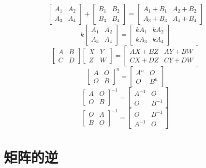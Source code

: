\[
\begin{bmatrix}
A_1 & A_2 \\ 
A_3 & A_4
\end{bmatrix} + 
\begin{bmatrix}
B_1 & B_2 \\ 
B_3 & B_4
\end{bmatrix} = 
\begin{bmatrix}
A_1 + B_1 & A_2 + B_2 \\ 
A_3 + B_3 & A_4 + B_4
\end{bmatrix}
\]
\[k
\begin{bmatrix}
A_1 & A_2 \\ 
A_3 & A_4
\end{bmatrix} = 
\begin{bmatrix}
kA_1 & kA_2 \\ 
kA_3 & kA_4
\end{bmatrix}
\]
\[
\begin{bmatrix}
A & B \\ 
C & D
\end{bmatrix}
\begin{bmatrix}
X & Y \\ 
Z & W
\end{bmatrix} = 
\begin{bmatrix}
AX + BZ & AY + BW \\ 
CX + DZ & CY + DW
\end{bmatrix}
\]
\[
\begin{bmatrix}
A & O \\ 
O & B
\end{bmatrix}^n = 
\begin{bmatrix}
A^n & O \\ 
O & B^n
\end{bmatrix}
\]
\[
\begin{bmatrix}
A & O \\ 
O & B
\end{bmatrix}^{-1} = 
\begin{bmatrix}
A^{-1} & O \\ 
O & B^{-1}
\end{bmatrix}
\]
\[
\begin{bmatrix}
O & A \\ 
B & O
\end{bmatrix}^{-1} = 
\begin{bmatrix}
O & B^{-1} \\ 
A^{-1} & O
\end{bmatrix}
\]


\section{矩阵的逆}

